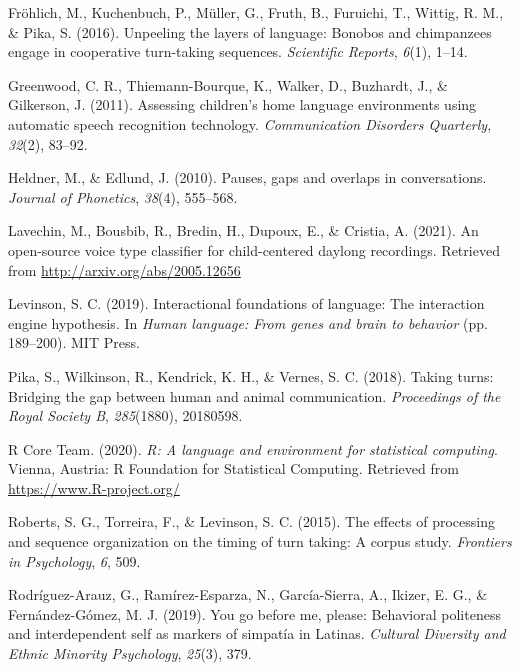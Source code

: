 \documentclass[10pt, letterpaper]{article}
\begin{document}
\leavevmode\hypertarget{ref-frohlich2016unpeeling}{}%
Fröhlich, M., Kuchenbuch, P., Müller, G., Fruth, B., Furuichi, T.,
Wittig, R. M., \& Pika, S. (2016). Unpeeling the layers of language:
Bonobos and chimpanzees engage in cooperative turn-taking sequences.
\emph{Scientific Reports}, \emph{6}(1), 1--14.

\leavevmode\hypertarget{ref-LENA}{}%
Greenwood, C. R., Thiemann-Bourque, K., Walker, D., Buzhardt, J., \&
Gilkerson, J. (2011). Assessing children's home language environments
using automatic speech recognition technology. \emph{Communication
Disorders Quarterly}, \emph{32}(2), 83--92.

\leavevmode\hypertarget{ref-heldner2010pauses}{}%
Heldner, M., \& Edlund, J. (2010). Pauses, gaps and overlaps in
conversations. \emph{Journal of Phonetics}, \emph{38}(4), 555--568.

\leavevmode\hypertarget{ref-lavechin2021vtc}{}%
Lavechin, M., Bousbib, R., Bredin, H., Dupoux, E., \& Cristia, A.
(2021). An open-source voice type classifier for child-centered daylong
recordings. Retrieved from \url{http://arxiv.org/abs/2005.12656}

\leavevmode\hypertarget{ref-levinson2019interactional}{}%
Levinson, S. C. (2019). Interactional foundations of language: The
interaction engine hypothesis. In \emph{Human language: From genes and
brain to behavior} (pp. 189--200). MIT Press.

\leavevmode\hypertarget{ref-pika2018taking}{}%
Pika, S., Wilkinson, R., Kendrick, K. H., \& Vernes, S. C. (2018).
Taking turns: Bridging the gap between human and animal communication.
\emph{Proceedings of the Royal Society B}, \emph{285}(1880), 20180598.

\leavevmode\hypertarget{ref-R}{}%
R Core Team. (2020). \emph{R: A language and environment for statistical
computing}. Vienna, Austria: R Foundation for Statistical Computing.
Retrieved from \url{https://www.R-project.org/}

\leavevmode\hypertarget{ref-roberts2015effects}{}%
Roberts, S. G., Torreira, F., \& Levinson, S. C. (2015). The effects of
processing and sequence organization on the timing of turn taking: A
corpus study. \emph{Frontiers in Psychology}, \emph{6}, 509.

\leavevmode\hypertarget{ref-rodriguez2019you}{}%
Rodríguez-Arauz, G., Ramírez-Esparza, N., García-Sierra, A., Ikizer, E.
G., \& Fernández-Gómez, M. J. (2019). You go before me, please:
Behavioral politeness and interdependent self as markers of simpatía in
Latinas. \emph{Cultural Diversity and Ethnic Minority Psychology},
\emph{25}(3), 379.
\end{document}
